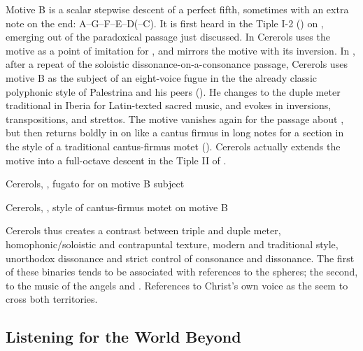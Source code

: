 Motive B is a scalar stepwise descent of a perfect fifth, sometimes with an
extra note on the end: A--G--F--E--D(--C\sh). 
It is first heard in the Tiple I-2 () on ,
emerging out of the paradoxical passage just discussed.
In  Cererols uses the motive as a point of imitation for
, and mirrors the motive with its
inversion.
In , after a repeat of the soloistic dissonance-on-a-consonance
passage, Cererols uses motive B as the subject of an eight-voice fugue in the
the already classic polyphonic style of Palestrina and his peers
().
He changes to the duple meter traditional in Iberia for Latin-texted sacred
music, and evokes  in inversions, transpositions,
and strettos.  
The motive vanishes again for the passage about , but then 
returns boldly in  on  like a
 cantus firmus in long notes for a section in the style of
a traditional cantus-firmus motet
().
Cererols actually extends the motive into a full-octave descent in the Tiple II
of .


{Cererols, , fugato  for  on motive B subject}

{Cererols, , style of cantus-firmus motet on motive B}

Cererols thus creates a contrast between triple and duple meter,
homophonic/soloistic and contrapuntal texture, modern and traditional style,
unorthodox dissonance and strict control of consonance and dissonance.
The first of these binaries tends to be associated with references to the
spheres; the second, to the music of the angels and . 
References to Christ's own voice as the  seem to cross both
territories.


\subsection{Listening for the World Beyond}

